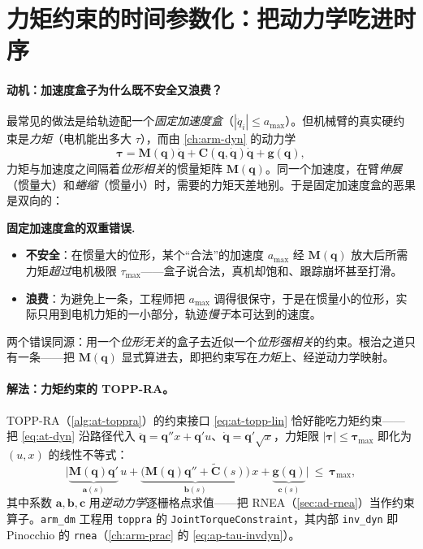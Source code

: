 \section{力矩约束的时间参数化：把动力学吃进时序}
\label{sec:at-torque-topp}

\paragraph{动机：加速度盒子为什么既不安全又浪费？}
最常见的做法是给轨迹配一个\emph{固定加速度盒}（$|\ddot q_i|\le a_{\max}$）。但机械臂的真实硬约束是\emph{力矩}（电机能出多大 $\tau$），而由 \cref{ch:arm-dyn} 的动力学
\begin{equation}
  \boldsymbol{\tau}=\mathbf{M}(\mathbf{q})\ddot{\mathbf{q}}+\mathbf{C}(\mathbf{q},\dot{\mathbf{q}})\dot{\mathbf{q}}+\mathbf{g}(\mathbf{q}),
  \label{eq:at-dyn}
\end{equation}
力矩与加速度之间隔着\emph{位形相关}的惯量矩阵 $\mathbf{M}(\mathbf{q})$。同一个加速度，在臂\emph{伸展}（惯量大）和\emph{蜷缩}（惯量小）时，需要的力矩天差地别。于是固定加速度盒的恶果是双向的：

\begin{pitfall}
\textbf{固定加速度盒的双重错误.}\;
\begin{itemize}
  \item \textbf{不安全}：在惯量大的位形，某个“合法”的加速度 $a_{\max}$ 经 $\mathbf{M}(\mathbf{q})$ 放大后所需力矩\emph{超过}电机极限 $\tau_{\max}$——盒子说合法，真机却饱和、跟踪崩坏甚至打滑。
  \item \textbf{浪费}：为避免上一条，工程师把 $a_{\max}$ 调得很保守，于是在惯量小的位形，实际只用到电机力矩的一小部分，轨迹\emph{慢于}本可达到的速度。
\end{itemize}
两个错误同源：用一个\emph{位形无关}的盒子去近似一个\emph{位形强相关}的约束。根治之道只有一条——把 $\mathbf{M}(\mathbf{q})$ 显式算进去，即把约束写在\emph{力矩}上、经逆动力学映射。
\end{pitfall}

\paragraph{解法：力矩约束的 TOPP-RA。}
TOPP-RA（\cref{alg:at-toppra}）的约束接口 \cref{eq:at-topp-lin} 恰好能吃力矩约束——把 \cref{eq:at-dyn} 沿路径代入 $\ddot{\mathbf{q}}=\mathbf{q}''x+\mathbf{q}'u$、$\dot{\mathbf{q}}=\mathbf{q}'\sqrt x$，力矩限 $|\boldsymbol{\tau}|\le\boldsymbol{\tau}_{\max}$ 即化为 $(u,x)$ 的线性不等式：
\begin{equation}
  \big|\underbrace{\mathbf{M}(\mathbf{q})\mathbf{q}'}_{\mathbf{a}(s)}\,u+\underbrace{\big(\mathbf{M}(\mathbf{q})\mathbf{q}''+\tilde{\mathbf{C}}(s)\big)}_{\mathbf{b}(s)}\,x+\underbrace{\mathbf{g}(\mathbf{q})}_{\mathbf{c}(s)}\big|\ \le\ \boldsymbol{\tau}_{\max},
  \label{eq:at-torque-con}
\end{equation}
其中系数 $\mathbf{a},\mathbf{b},\mathbf{c}$ 用\emph{逆动力学}逐栅格点求值——把 RNEA（\cref{sec:ad-rnea}）当作约束算子。\texttt{arm\_dm} 工程用 \texttt{toppra} 的 \texttt{JointTorqueConstraint}，其内部 \texttt{inv\_dyn} 即 Pinocchio 的 \texttt{rnea}（\cref{ch:arm-prac} 的 \cref{eq:ap-tau-invdyn}）。

